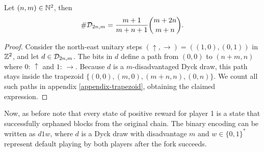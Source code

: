 \begin{myprop}
	\label{prop-trapezoidcardinality}
	Let $(n,m)\in \mathbb{N}^2$, then 
	$$\#\mathcal{D}_{2n,m}=\frac{m+1}{m+n+1}{m+2n\choose m+n}.$$
\end{myprop}
\begin{proof}
Consider the north-east unitary steps $(\uparrow,\rightarrow)=((1,0),(0,1))$ in $\mathbb{Z}^2$, and let $d\in \mathcal{D}_{2n,m}$. The bits in $d$ define a path from $(0,0)$ to $(n+m,n)$ where $0:\,\uparrow$ and $1:\,\rightarrow$. Because $d$ is a $m$-disadvantaged Dyck draw, this path stays inside the trapezoid $\{(0,0),(m,0),(m+n,n),(0,n)\}$. We count all such paths in appendix \ref{appendix-trapezoid}, obtaining the claimed expression.
\end{proof}
Now, as before note that every state of positive reward for player 1 is a state that successfully orphaned blocks from the original chain. The binary encoding can be written as $d1w$, where $d$ is a Dyck draw with disadvantage $m$ and $w\in\{0,1\}^\ast$ represent default playing by both players after the fork succeeds. 


